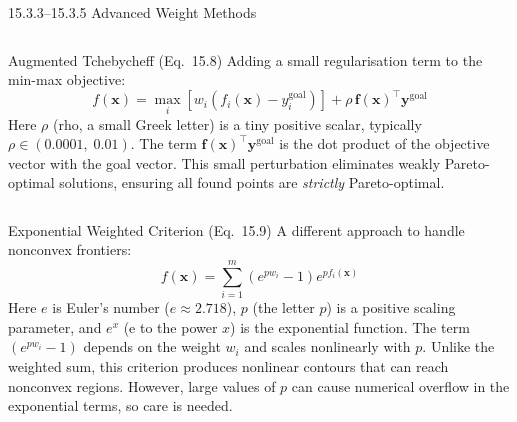 \documentclass[aspectratio=169,10pt]{beamer}
\newcommand{\bx}{\mathbf{x}}
\newcommand{\by}{\mathbf{y}}
\newcommand{\bff}{\mathbf{f}}
\begin{document}
\begin{frame}[allowframebreaks]{15.3.3--15.3.5 Advanced Weight Methods}
\begin{columns}
\begin{block}{Augmented Tchebycheff (Eq.\ 15.8)}
  Adding a small regularisation term to the min-max objective:
  \[
    f(\bx) = \max_i\!\left[w_i\!\left(f_i(\bx) - y_i^{\mathrm{goal}}\right)\right]
    + \rho\,\bff(\bx)^\top \by^{\mathrm{goal}}
  \]
  Here $\rho$ (rho, a small Greek letter) is a tiny positive scalar,
  typically $\rho \in (0.0001,\; 0.01)$.  The term
  $\bff(\bx)^\top \by^{\mathrm{goal}}$ is the dot product of the objective
  vector with the goal vector.  This small perturbation eliminates
  weakly Pareto-optimal solutions, ensuring all found points are
  \emph{strictly} Pareto-optimal.
\end{block}
\end{columns}

\begin{block}{Exponential Weighted Criterion (Eq.\ 15.9)}
  A different approach to handle nonconvex frontiers:
  \[
    f(\bx) = \sum_{i=1}^{m} \left(e^{p w_i} - 1\right) e^{p f_i(\bx)}
  \]
  Here $e$ is Euler's number ($e \approx 2.718$), $p$ (the letter $p$) is
  a positive scaling parameter, and $e^x$ (e to the power $x$) is the
  exponential function.  The term $(e^{p w_i} - 1)$ depends on the weight
  $w_i$ and scales nonlinearly with $p$.  Unlike the weighted sum, this
  criterion produces nonlinear contours that can reach nonconvex regions.
  However, large values of $p$ can cause numerical overflow in the
  exponential terms, so care is needed.
\end{block}

\end{frame}
\end{document}
